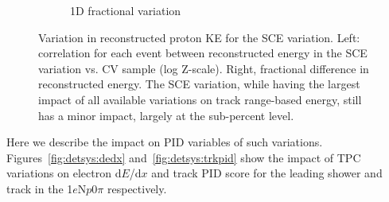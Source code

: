 \documentclass[a4paper]{article}
\newcommand{\npsel}{1$e$N$p$0$\pi$\xspace}
\newcommand{\dedx}{d$E$/d$x$\xspace}
\begin{document}
\begin{figure}[H]
\begin{center}
\begin{subfigure}[b]{0.3\textwidth}
    \caption{\label{fig:detsys:proton:1d}1D fractional variation}
    \end{subfigure}
\caption{\label{fig:detsys:proton}Variation in reconstructed proton KE for the SCE variation. Left: correlation for each event between reconstructed energy in the SCE variation vs. CV sample (log Z-scale). Right, fractional difference in reconstructed energy. The SCE variation, while having the largest impact of all available variations on track range-based energy, still has a minor impact, largely at the sub-percent level.}
\end{center}
\end{figure}

Here we describe the impact on PID variables of such variations. Figures~\ref{fig:detsys:dedx} and~\ref{fig:detsys:trkpid} show the impact of TPC variations on electron \dedx and track PID score for the leading shower and track in the \npsel respectively.
\end{document}
